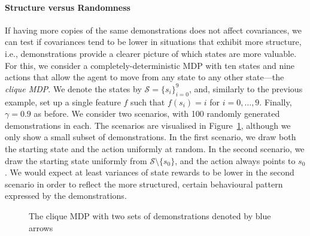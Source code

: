 \documentclass{mpaper}
\begin{document}
\paragraph{Structure versus Randomness}

If having more copies of the same demonstrations does not affect covariances, we
can test if covariances tend to be lower in situations that exhibit more
structure, i.e., demonstrations provide a clearer picture of which states are
more valuable. For this, we consider a completely-deterministic MDP with ten
states and nine actions that allow the agent to move from any state to any other
state---the \emph{clique MDP}. We denote the states by $\mathcal{S} = \{ s_i
\}_{i=0}^9$, and, similarly to the previous example, set up a single feature $f$
such that $f(s_i) = i$ for $i = 0, \dots, 9$. Finally, $\gamma = 0.9$ as before.
We consider two scenarios, with 100 randomly generated demonstrations in each.
The scenarios are visualised in Figure~\ref{fig:cliques}, although we only show
a small subset of demonstrations. In the first scenario, we draw both the
starting state and the action uniformly at random. In the second scenario, we
draw the starting state uniformly from $\mathcal{S} \setminus \{ s_0 \}$, and
the action always points to $s_0$. We would expect at least variances of state
rewards to be lower in the second scenario in order to reflect the more
structured, certain behavioural pattern expressed by the demonstrations.

\begin{figure}[!t]
  \centering
  \caption{The clique MDP with two sets of demonstrations denoted by blue arrows}
  \label{fig:cliques}
\end{figure}
\end{document}

